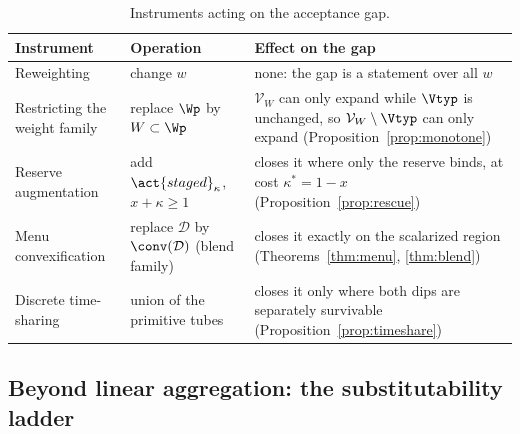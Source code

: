 \begin{table}[!htbp]
\centering\small
\caption{Instruments acting on the acceptance gap.}
\label{tab:instruments}
\begin{tabularx}{\textwidth}{@{}>{\raggedright\arraybackslash}p{}>{\raggedright\arraybackslash}p{}X@{}}
\toprule
Instrument & Operation & Effect on the gap \\
\midrule
Reweighting & change $w$ & none: the gap is a statement over all $w$ \\
Restricting the weight family & replace $\Wp$ by $W\subset\Wp$ & $\mathcal V_W$ can only expand while $\Vtyp$ is unchanged, so $\mathcal V_W\setminus\Vtyp$ can only expand (Proposition~\ref{prop:monotone}) \\
Reserve augmentation & add $\act{staged}_\kappa$, $x+\kappa\ge1$ & closes it where only the reserve binds, at cost $\kappa^*=1-x$ (Proposition~\ref{prop:rescue}) \\
Menu convexification & replace $\mathcal D$ by $\conv(\mathcal D)$ (blend family) & closes it exactly on the scalarized region (Theorems~\ref{thm:menu}, \ref{thm:blend}) \\
Discrete time-sharing & union of the primitive tubes & closes it only where both dips are separately survivable (Proposition~\ref{prop:timeshare}) \\
\bottomrule
\end{tabularx}
\end{table}

\subsection{Beyond linear aggregation: the substitutability ladder}\label{sec:ladder}

